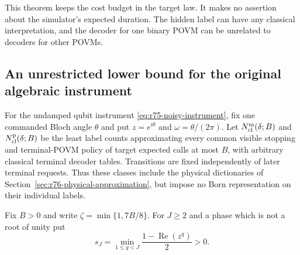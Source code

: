 This theorem keeps the cost budget in the target law.  It makes no
assertion about the simulator's expected duration.  The hidden label
can have any classical interpretation, and the decoder for one binary
POVM can be unrelated to decoders for other POVMs.

\subsection{An unrestricted lower bound for the original algebraic instrument}

For the undamped qubit instrument
\eqref{eq:r75-noisy-instrument}, fix one commanded Bloch angle
$\theta$ and put $z=e^{i\theta}$ and $\omega=\theta/(2\pi)$.  Let
$N_{\rm cl}^{\rm m}(\delta;B)$ and
$N_{\rm cl}^{\rm p}(\delta;B)$ be the least label counts approximating
every common visible stopping and terminal-POVM policy of target expected
calls at most $B$, with arbitrary classical terminal decoder tables.
Transitions are fixed independently of later terminal requests.  Thus
these classes include the physical dictionaries of
Section~\ref{sec:r76-physical-approximation}, but impose no Born
representation on their individual labels.

Fix $B>0$ and write $\zeta=\min\{1,7B/8\}$.  For $J\ge2$ and
a phase which is not a root of unity put
\begin{equation}\label{eq:r77-phase-margin}
 s_J=\min_{1\le q<J}\frac{1-\operatorname{Re}(z^q)}{2}>0.
\end{equation}

